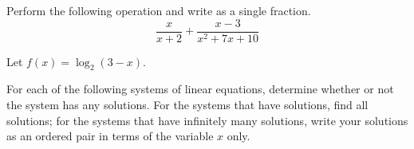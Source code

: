 \begin{questions}

\question[5] Perform the following operation and write as a single fraction.
\[
\frac{x}{x+2}+\frac{x-3}{x^2+7x+10}
\]

\newpage
\question %
Let $f(x)=\log_2(3-x)$.

\newpage


\question %
For each of the following systems of linear equations, determine whether or not the system has any solutions. For the systems that have solutions, find all solutions; for the systems that have infinitely many solutions, write your solutions as an ordered pair in terms of the variable $x$ only.

\begin{parts}
    
    

\end{parts}
\end{questions}
